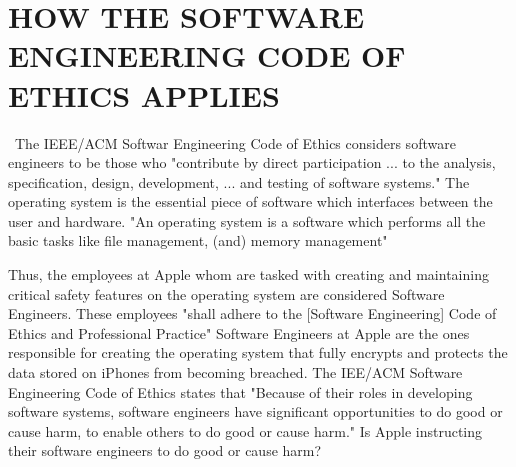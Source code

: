 \section{HOW THE SOFTWARE ENGINEERING CODE OF ETHICS APPLIES}\
The IEEE/ACM Softwar Engineering Code of Ethics considers software engineers to be those who "contribute by direct participation ... to the analysis, specification, design, development, ... and testing of software systems." \cite{SE-Code}
The operating system is the essential piece of software which interfaces between the user and hardware. "An operating system is a software which performs all the basic tasks like file management, (and) memory management" \cite{tutorialspoint}\par

Thus, the employees at Apple whom are tasked with creating and maintaining critical safety features on the operating system are considered Software Engineers. These employees "shall adhere to the [Software Engineering] Code of Ethics and Professional Practice" \cite{SE-Code}
Software Engineers at Apple are the ones responsible for creating the operating system that fully encrypts and protects the data stored on iPhones from becoming breached. The IEE/ACM Software Engineering Code of Ethics states that "Because of their roles in developing software systems, software engineers have significant opportunities to do good or cause harm, to enable others to do good or cause harm." \cite{SE-Code} Is Apple instructing their software engineers to do good or cause harm? \par


\vspace{0.4cm}
